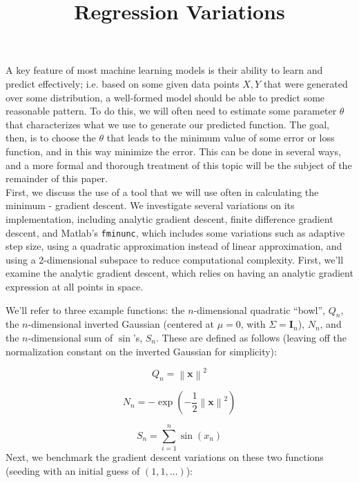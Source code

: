 \documentclass[11pt,letterpaper]{article}
\title{\vspace{-4ex}Regression Variations\vspace{-3.5ex}}
\begin{document}
\maketitle
\vspace{-0.5em}
A key feature of most machine learning models is their ability to learn and predict effectively; i.e. based on some given data points $X, Y$ that were generated over some distribution, a well-formed model should be able to predict some reasonable pattern. To do this, we will often need to estimate some parameter $\theta$ that characterizes what we use to generate our predicted function. The goal, then, is to choose the $\theta$ that leads to the minimum value of some error or loss function, and in this way minimize the error. This can be done in several ways, and a more formal and thorough treatment of this topic will be the subject of the remainder of this paper.\\

First, we discuss the use of a tool that we will use often in calculating the minimum - gradient descent. We investigate several variations on its implementation, including analytic gradient descent, finite difference gradient descent, and Matlab's \texttt{fminunc}, which includes some variations such as adaptive step size, using a quadratic approximation instead of linear approximation, and using a 2-dimensional subspace to reduce computational complexity. First, we'll examine the analytic gradient descent, which relies on having an analytic gradient expression at all points in space.

We'll refer to three example functions: the $n$-dimensional quadratic ``bowl'', $Q_n$, the $n$-dimensional inverted Gaussian (centered at $\mu = 0$, with $\Sigma = \mathbf I_n$), $N_n$, and the $n$-dimensional sum of $\sin$'s, $S_n$. These are defined as follows (leaving off the normalization constant on the inverted Gaussian for simplicity):

\[ Q_n = \left\| \mathbf x \right\| ^2 \]

\[ N_n = -\exp{\left(-\dfrac{1}{2} \left\| \mathbf x \right\| ^2 \right)} \]

\[ S_n = \sum_{i=1}^n \sin(x_n) \]
Next, we benchmark the gradient descent variations on these two functions (seeding with an initial guess of $(1,1,\ldots)$):
\end{document}
